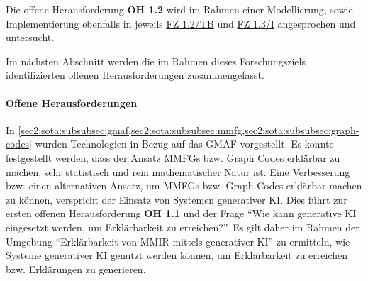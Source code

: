 Die offene Herausforderung \textbf{OH 1.2} wird im Rahmen einer Modellierung, sowie Implementierung ebenfalls in jeweils \hyperref[sec3:model:subsec:fz-explainability]{FZ 1.2/TB} und \hyperref[sec4:impl:subsec:fz-explainability]{FZ 1.3/I} angesprochen und untersucht.

Im nächsten Abschnitt werden die im Rahmen dieses Forschungsziels identifizierten offenen Herausforderungen zusammengefasst.

\paragraph{Offene Herausforderungen}
\label{sec2:sota:par:fz1:open-challenges}
In \cref{sec2:sota:subsubsec:gmaf,sec2:sota:subsubsec:mmfg,sec2:sota:subsubsec:graph-codes} wurden Technologien in Bezug auf das GMAF vorgestellt.
Es konnte festgestellt werden, dass der Ansatz MMFGs bzw. Graph Codes erklärbar zu machen, sehr statistisch und rein mathematischer Natur ist.
Eine Verbesserung bzw. einen alternativen Ansatz, um MMFGs bzw. Graph Codes erklärbar machen zu können, verspricht der Einsatz von Systemen generativer KI.
Dies führt zur ersten offenen Herausforderung \textbf{OH 1.1} und der Frage \enquote{Wie kann generative KI eingesetzt werden, um Erklärbarkeit zu erreichen?}.
Es gilt daher im Rahmen der Umgebung \enquote{Erklärbarkeit von MMIR mittels generativer KI} zu ermitteln, wie Systeme generativer KI genutzt werden können, um Erklärbarkeit zu erreichen bzw. Erklärungen zu generieren.


